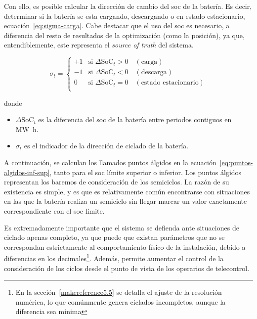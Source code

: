 Con ello, es posible calcular la dirección de cambio del \gls{soc} de la batería. Es decir, determinar si la batería se esta cargando, descargando o en estado estacionario, ecuación~\ref{eq:sigma-carga}. Cabe destacar que el uso del \gls{soc} es necesario, a diferencia del resto de resultados de la optimización (como la posición), ya que, entendiblemente, este representa el \textit{source of truth} del sistema.

\begin{samepage}

  \begin{equation}
    \label{eq:sigma-carga}
    \sigma_{t} =
    \begin{cases}
      +1 & \text{si } \Delta\mathrm{SoC}_{t} > 0 \quad (\text{carga})               \\
      -1 & \text{si } \Delta\mathrm{SoC}_{t} < 0 \quad (\text{descarga})            \\
      0  & \text{si } \Delta\mathrm{SoC}_{t} = 0 \quad (\text{estado estacionario}) \\
    \end{cases}
  \end{equation}

  donde

  \begin{itemize}

    \item \( \Delta \mathrm{SoC}_{t} \) es la diferencia del \gls{soc} de la batería entre periodos contiguos en \si{{\mega\watt\hour}}.

    \item \( \sigma_{t} \) es el indicador de la dirección de ciclado de la batería.

  \end{itemize}

\end{samepage}

A continuación, se calculan los llamados puntos álgidos en la ecuación~\ref{eq:puntos-algidos-inf-sup}, tanto para el \gls{soc} límite superior o inferior. Los puntos álgidos representan los baremos de consideración de los semiciclos. La razón de su existencia es simple, y es que es relativamente común encontrarse con situaciones en las que la batería realiza un semiciclo sin llegar marcar un valor exactamente correspondiente con el \gls{soc} límite.

Es extremadamente importante que el sistema se defienda ante situaciones de ciclado apenas completo, ya que puede que existan parámetros que no se correspondan estrictamente al comportamiento físico de la instalación, debido a diferencias en los decimales\footnote{En la sección~\ref{makereference5.5} se detalla el ajuste de la resolución numérica, lo que comúnmente genera ciclados incompletos, aunque la diferencia sea mínima}. Además, permite aumentar el control de la consideración de los ciclos desde el punto de vista de los operarios de telecontrol.


